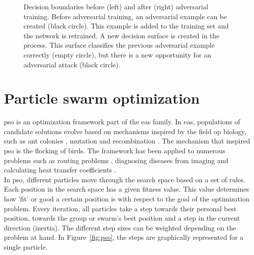 \begin{figure}
\begin{tikzpicture}[x=0.75pt,y=0.75pt,yscale=-1,xscale=1]
\end{tikzpicture}
\caption[Adversarial training]{Decision boundaries before (left) and after (right) adversarial training. Before adversarial training, an adversarial example can be created (black circle). This example is added to the training set and the network is retrained. A new decision surface is created in the process. This surface classifies the previous adversarial example correctly (empty circle), but there is a new opportunity for an adversarial attack (black circle).}
\label{fig:adversarial_training}
\end{figure}


\section{Particle swarm optimization}
\gls{pso} \cite{pso} is an optimization framework part of the \glspl{ea} family. In \glspl{ea}, populations of candidate solutions evolve based on mechanisms inspired by the field op biology, such as ant colonies \cite{aco}, mutation and recombination \cite{genetic_algorithm}. The mechanism that inspired \gls{pso} is the flocking of birds. The framework has been applied to numerous problems such as routing problems \cite{ev_transport, freight_transport}, diagnosing diseases from imaging \cite{leukemia_pso} and calculating heat transfer coefficients \cite{heat_transfer_pso}.\\

In \gls{pso}, different particles move through the search space based on a set of rules. Each position in the search space has a given fitness value. This value determines how 'fit' or good a certain position is with respect to the goal of the optimization problem. Every iteration, all particles take a step towards their personal best position, towards the group or swarm's best position and a step in the current direction (inertia). The different step sizes can be weighted depending on the problem at hand. In Figure~\ref{fig:pso}, the steps are graphically represented for a single particle.   

